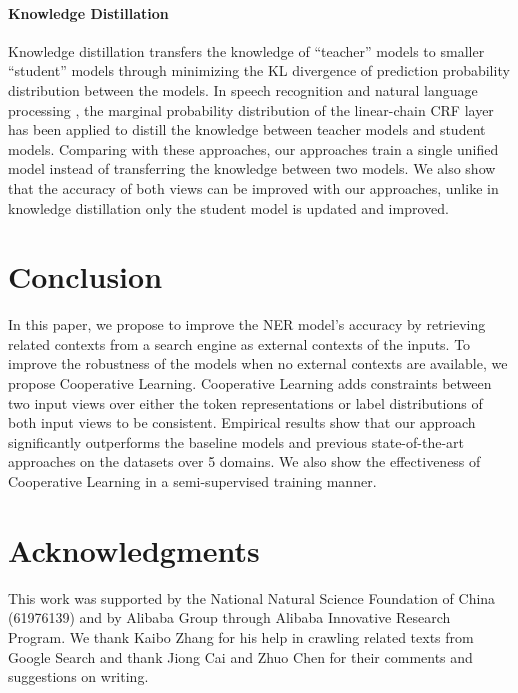 \documentclass[11pt,a4paper]{article}
\begin{document}
\paragraph{Knowledge Distillation}
Knowledge distillation \citep{Bucilua:2006:MC:1150402.1150464,44873} transfers the knowledge of ``teacher'' models to smaller ``student'' models through minimizing the KL divergence of prediction probability distribution between the models. In speech recognition \citep{Huang2018} and natural language processing \citep{wang-etal-2020-structure,wang2020structural}, the marginal probability distribution of the linear-chain CRF layer has been applied to distill the knowledge between teacher models and student models. Comparing with these approaches, our approaches train a single unified model instead of transferring the knowledge between two models. We also show that the accuracy of both views can be improved with our approaches, unlike in knowledge distillation only the student model is updated and improved.

\section{Conclusion}
In this paper, we propose to improve the NER model's accuracy by retrieving related contexts from a search engine as external contexts of the inputs. To improve the robustness of the models when no external contexts are available, we propose Cooperative Learning. Cooperative Learning adds constraints between two input views over either the token representations or label distributions of both input views to be consistent. Empirical results show that our approach significantly outperforms the baseline models and previous state-of-the-art approaches on the datasets over 5 domains. We also show the effectiveness of Cooperative Learning in a semi-supervised training manner. 

\section*{Acknowledgments}
This work was supported by the National Natural Science Foundation of China (61976139) and by Alibaba Group through Alibaba Innovative Research Program. We thank Kaibo Zhang for his help in crawling related texts from Google Search and thank Jiong Cai and Zhuo Chen for their comments and suggestions on writing. 





\end{document}
